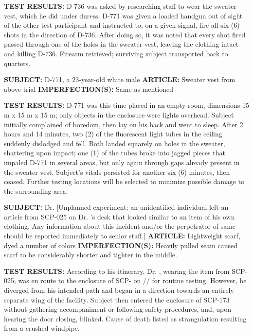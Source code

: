 \begin{leftbar}
\textbf{TEST RESULTS:} D-736 was asked by researching staff to wear the sweater vest, which he did under duress. D-771 was given a loaded handgun out of sight of the other test participant and instructed to, on a given signal, fire all six (6) shots in the direction of D-736. After doing so, it was noted that every shot fired passed through one of the holes in the sweater vest, leaving the clothing intact and killing D-736. Firearm retrieved; surviving subject transported back to quarters.
\begin{flushleft}
\textbf{SUBJECT:} D-771, a 23-year-old white male\linebreak
\textbf{ARTICLE:} Sweater vest from above trial\linebreak
\textbf{IMPERFECTION(S):} Same as mentioned
\end{flushleft}
\textbf{TEST RESULTS:} D-771 was this time placed in an empty room, dimensions 15 m x 15 m x 15 m; only objects in the enclosure were lights overhead. Subject initially complained of boredom, then lay on his back and went to sleep. After 2 hours and 14 minutes, two (2) of the fluorescent light tubes in the ceiling suddenly dislodged and fell. Both landed squarely on holes in the sweater, shattering upon impact; one (1) of the tubes broke into jagged pieces that impaled D-771 in several areas, but only again through gaps already present in the sweater vest. Subject's vitals persisted for another six (6) minutes, then ceased. Further testing locations will be selected to minimize possible damage to the surrounding area.
\begin{flushleft}
\textbf{SUBJECT:} Dr.  [Unplanned experiment; an unidentified individual left an article from SCP-025 on Dr. 's desk that looked similar to an item of his own clothing. Any information about this incident and/or the perpetrator of same should be reported immediately to senior staff.]\linebreak
\textbf{ARTICLE:} Lightweight scarf, dyed a number of colors\linebreak
\textbf{IMPERFECTION(S):} Heavily pulled seam caused scarf to be considerably shorter and tighter in the middle.
\end{flushleft}
\textbf{TEST RESULTS:} According to his itinerary, Dr. , wearing the item from SCP-025, was en route to the enclosure of SCP- on // for routine testing. However, he diverged from his intended path and began in a direction towards an entirely separate wing of the facility. Subject then entered the enclosure of SCP-173 without gathering accompaniment or following safety procedures, and, upon hearing the door closing, blinked. Cause of death listed as strangulation resulting from a crushed windpipe.

\end{leftbar}
